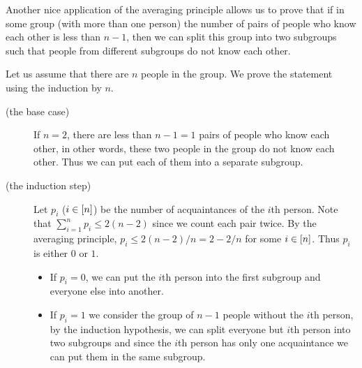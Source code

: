 Another nice application of the averaging principle allows us to prove that if
in some group (with more than one person) the number of pairs of people who
know each other is less than $n - 1$, then we can split this group into two
subgroups such that people from different subgroups do not know each other.

Let us assume that there are $n$ people in the group. We prove the statement
using the induction by $n$.
\begin{description}
  \item [(the base case)] If $n = 2$, there are less than $n - 1 = 1$ pairs
    of people who know each other, in other words, these two people in the
    group do not know each other. Thus we can put each of them into a separate
    subgroup.
  \item [(the induction step)] Let $p_i$ ($i \in {[{n}]}$) be the number of
    acquaintances of the $i$th person. Note that
    $\sum_{i = 1}^n p_i \le 2(n - 2)$ since we count each pair twice.
    By the averaging principle, $p_i \le 2(n - 2) / n = 2 - 2 / n$ for some
    $i \in {[{n}]}$.  Thus $p_i$ is either $0$ or $1$.
    \begin{itemize}
      \item If $p_i = 0$, we can put the $i$th person into the first subgroup
        and everyone else into another.
      \item If $p_i = 1$ we consider the group of $n - 1$ people without the
        $i$th person, by the induction hypothesis, we can split everyone but
        $i$th person into two subgroups and since the $i$th person has only one
        acquaintance we can put them in the same subgroup.
      \end{itemize}
\end{description}



